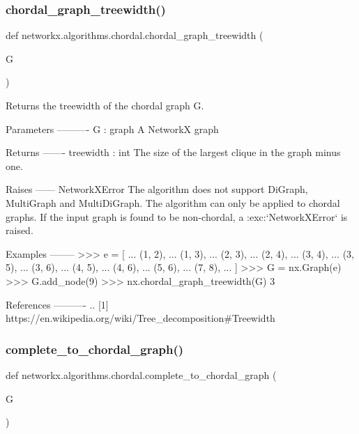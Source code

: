 \subsubsection{\texorpdfstring{chordal\+\_\+graph\+\_\+treewidth()}{chordal\_graph\_treewidth()}}
{\footnotesize\ttfamily def networkx.\+algorithms.\+chordal.\+chordal\+\_\+graph\+\_\+treewidth (\begin{DoxyParamCaption}\item[{}]{G }\end{DoxyParamCaption})}

\begin{DoxyVerb}Returns the treewidth of the chordal graph G.

Parameters
----------
G : graph
  A NetworkX graph

Returns
-------
treewidth : int
    The size of the largest clique in the graph minus one.

Raises
------
NetworkXError
    The algorithm does not support DiGraph, MultiGraph and MultiDiGraph.
    The algorithm can only be applied to chordal graphs. If the input
    graph is found to be non-chordal, a :exc:`NetworkXError` is raised.

Examples
--------
>>> e = [
...     (1, 2),
...     (1, 3),
...     (2, 3),
...     (2, 4),
...     (3, 4),
...     (3, 5),
...     (3, 6),
...     (4, 5),
...     (4, 6),
...     (5, 6),
...     (7, 8),
... ]
>>> G = nx.Graph(e)
>>> G.add_node(9)
>>> nx.chordal_graph_treewidth(G)
3

References
----------
.. [1] https://en.wikipedia.org/wiki/Tree_decomposition#Treewidth
\end{DoxyVerb}
 \mbox{\label{namespacenetworkx_1_1algorithms_1_1chordal_a2c5ab1c68e004234ae71af003b7f3220}} 
\subsubsection{\texorpdfstring{complete\+\_\+to\+\_\+chordal\+\_\+graph()}{complete\_to\_chordal\_graph()}}
{\footnotesize\ttfamily def networkx.\+algorithms.\+chordal.\+complete\+\_\+to\+\_\+chordal\+\_\+graph (\begin{DoxyParamCaption}\item[{}]{G }\end{DoxyParamCaption})}


